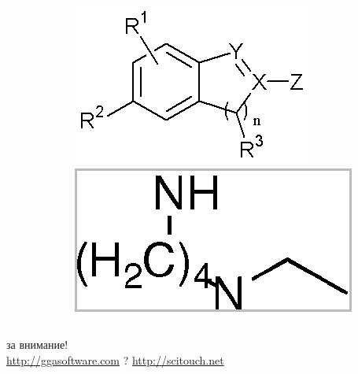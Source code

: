 \begin{frame}
\begin{columns}
\begin{column}{0.7\textwidth}
\end{column}
\begin{column}{0.5\textwidth}
  \includegraphics[scale=0.5]{media/Markush.png} \\
  \includegraphics[scale=0.3]{media/complex2.png} \\
\end{column}
\end{columns}
\end{frame}

\begin{frame}
   \begin{center}
      за внимание! \\ 
     \url{http://ggasoftware.com} ? \url{http://scitouch.net}
   \end{center}
\end{frame}


